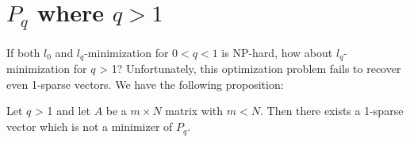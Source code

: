 \section* {$P_q$ where $q > 1$ }

If both $l_0$ and $l_q$-minimization for $0 < q < 1$ is NP-hard, how about $l_q$-minimization for $q$ > 1? Unfortunately, this optimization problem fails to recover even 1-sparse vectors. We have the following proposition:

\begin{tcolorbox}[colback=green,colframe=white]
\begin{proposition}
Let $q$ > 1 and let $A$ be a $m \times N$ matrix with $m < N$. Then there exists a 1-sparse vector which is not a minimizer of $P_q$. 
\end{proposition}
\end{tcolorbox}

